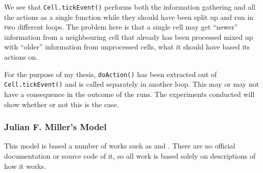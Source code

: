 We see that \texttt{Cell.tickEvent()} performs both the information gathering and all the actions as a single function while they should have been split up and run in two different loops. The problem here is that a single cell may get ``newer'' information from a neighbouring cell that already has been processed mixed up with ``older'' information from unprocessed cells, what it should have based its actions on.

For the purpose of my thesis, \texttt{doAction()} has been extracted out of \texttt{Cell.tickEvent()} and is called separately in another loop. This may or may not have a consequence in the outcome of the runs. The experiments conducted will show whether or not this is the case.


\subsubsection{Julian F. Miller's Model}
This model is based a number of works such as \cite{mteurogp2000} and \cite{ecal2003}. There are no official documentation or source code of it, so all work is based solely on descriptions of how it works.
